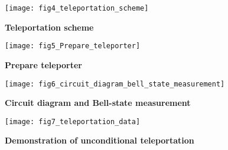 \begin{figure}[tp]
	\texttt{[image: fig4\_teleportation\_scheme]}
	\caption{\label{fig:LDE-fig4} \textbf{Teleportation scheme} }
\end{figure}

\begin{figure}[tp]
	\texttt{[image: fig5\_Prepare\_teleporter]}
	\caption{\label{fig:LDE-fig5} \textbf{Prepare teleporter} }
\end{figure}

\begin{figure}[tp]
	\texttt{[image: fig6\_circuit\_diagram\_bell\_state\_measurement]}
	\caption{\label{fig:LDE-fig6} \textbf{Circuit diagram and Bell-state measurement} }
\end{figure}

\begin{figure}[tp]
	\texttt{[image: fig7\_teleportation\_data]}
	\caption{\label{fig:LDE-fig7} \textbf{Demonstration of unconditional teleportation} }
\end{figure}

\clearpage



